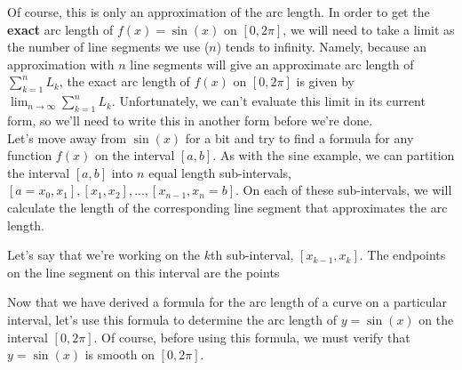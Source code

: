 \documentclass[handout,nooutcomes]{ximera}
\begin{document}
Of course, this is only an approximation of the arc length.  In order to get the \textbf{exact} arc length of $f(x) = \sin(x)$ on $[0, 2\pi]$, we will need to take a limit as the number of line segments we use ($n$) tends to infinity.  Namely, because an approximation with $n$ line segments will give an approximate arc length of $\displaystyle\sum_{k=1}^n L_k$, the exact arc length of $f(x)$ on $[0, 2\pi]$ is given by $\displaystyle\lim_{n \to \infty} \displaystyle\sum_{k=1}^n L_k$.  Unfortunately, we can't evaluate this limit in its current form, so we'll need to write this in another form before we're done.  \\

Let's move away from $\sin(x)$ for a bit and try to find a formula for any function $f(x)$ on the interval $[a,b]$.  As with the sine example, we can partition the interval $[a,b]$ into $n$ equal length sub-intervals, $[a=x_0, x_1], [x_1, x_2], ..., [x_{n-1}, x_n = b]$.  On each of these sub-intervals, we will calculate the length of the corresponding line segment that approximates the arc length.

\begin{problem}
Let's say that we're working on the $k$th sub-interval, $[x_{k-1}, x_k]$.  The endpoints on the line segment on this interval are the points 
\begin{selectAll}
\end{selectAll}
\end{problem}




Now that we have derived a formula for the arc length of a curve on a particular interval, let's use this formula to determine the arc length of $y=\sin(x)$ on the interval $[0,2\pi]$.  Of course, before using this formula, we must verify that $y=\sin(x)$ is smooth on $[0,2\pi]$.
\end{document}
